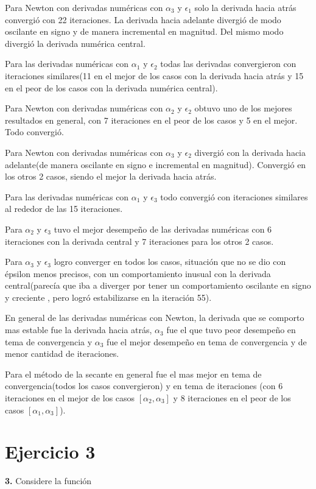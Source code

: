 \documentclass{article} %
\begin{document}
Para Newton con derivadas numéricas con $\alpha_3$ y $\epsilon_1$ solo la derivada hacia atrás convergió con 22 iteraciones. La derivada hacia adelante divergió de modo oscilante en signo y de manera incremental en magnitud. Del mismo modo divergió la derivada numérica central.

Para las derivadas numéricas con $\alpha_1$ y $\epsilon_2$ todas las derivadas convergieron con iteraciones similares(11 en el mejor de los casos con la derivada hacia atrás y 15 en el peor de los casos con la derivada numérica central).

Para Newton con derivadas numéricas con $\alpha_2$ y $\epsilon_2$ obtuvo uno de los mejores resultados en general, con 7 iteraciones en el peor de los casos y 5 en el mejor. Todo convergió.

Para Newton con derivadas numéricas con $\alpha_3$ y $\epsilon_2$ divergió con la derivada hacia adelante(de manera oscilante en signo e incremental en magnitud). Convergió en los otros 2 casos, siendo el mejor la derivada hacia atrás.

Para las derivadas numéricas con $\alpha_1$ y $\epsilon_3$ todo convergió con iteraciones similares al rededor de las 15 iteraciones.

Para $\alpha_2$ y $\epsilon_3$ tuvo el mejor desempeño de las derivadas numéricas con 6 iteraciones con la derivada central y 7 iteraciones para los otros 2 casos.

Para $\alpha_3$ y $\epsilon_3$ logro converger en todos los casos, situación que no se dio con épsilon menos precisos, con un comportamiento inusual con la derivada central(parecía que iba a diverger por tener un comportamiento oscilante en signo y creciente , pero logró estabilizarse en la iteración 55).

En general de las derivadas numéricas con Newton, la derivada que se comporto mas estable fue la derivada hacia atrás, $\alpha_3$ fue el que tuvo peor desempeño en tema de convergencia y $\alpha_3$ fue el mejor desempeño en tema de convergencia y de menor cantidad de iteraciones.

Para el método de la secante en general fue el mas mejor en tema de convergencia(todos los casos convergieron) y en tema de iteraciones (con 6 iteraciones en el mejor de los casos $[\alpha_2,\alpha_3]$ y 8 iteraciones en el peor de los casos $[\alpha_1,\alpha_3]$).
\newpage
\section*{Ejercicio 3}
\textbf{3.} Considere la función
\end{document}
